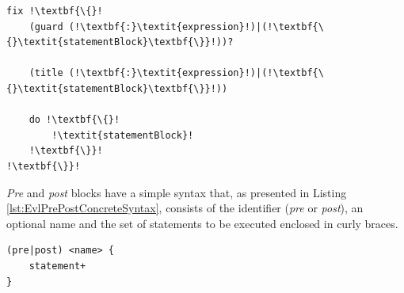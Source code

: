 \begin{lstlisting}[float=t, caption=Concrete Syntax of an EVL fix, label=lst:FixConcreteSyntax, language=EVL, escapechar=!]
fix !\textbf{\{}!
	(guard (!\textbf{:}\textit{expression}!)|(!\textbf{\{}\textit{statementBlock}\textbf{\}}!))?
	
	(title (!\textbf{:}\textit{expression}!)|(!\textbf{\{}\textit{statementBlock}\textbf{\}}!))
	
	do !\textbf{\{}!
		!\textit{statementBlock}!
	!\textbf{\}}!
!\textbf{\}}!
\end{lstlisting}

\emph{Pre} and \emph{post} blocks have a simple syntax that, as presented in Listing \ref{lst:EvlPrePostConcreteSyntax}, consists of the identifier (\emph{pre} or \emph{post}), an optional name and the set of statements to be executed enclosed in curly braces.

\begin{lstlisting}[float=t, caption=Concrete Syntax of Pre and Post blocks, label=lst:EvlPrePostConcreteSyntax, language=EVL]
(pre|post) <name> {
	statement+
}
\end{lstlisting}





